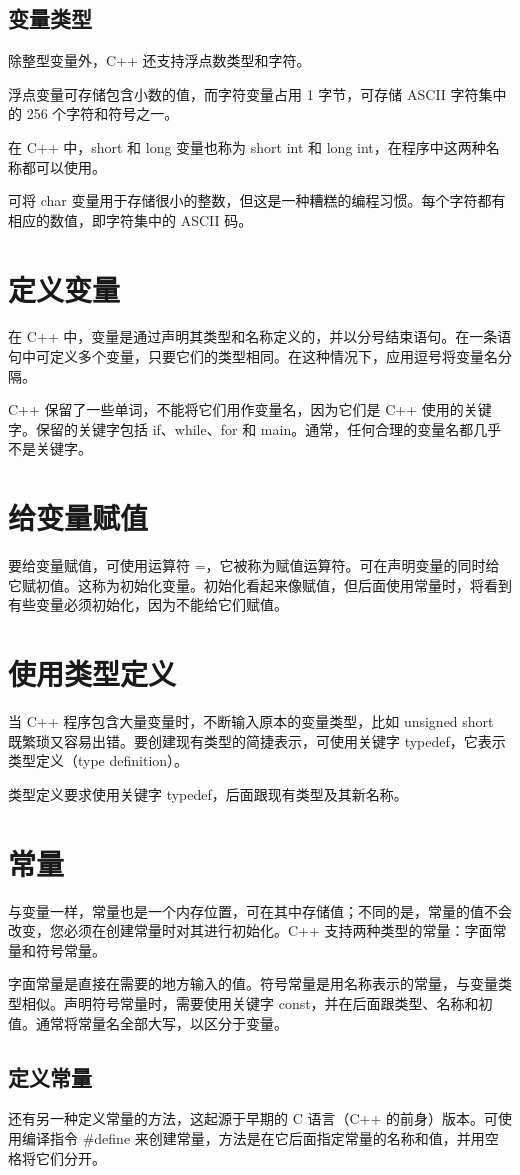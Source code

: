 \subsection*{变量类型}
除整型变量外，C++ 还支持浮点数类型和字符。

浮点变量可存储包含小数的值，而字符变量占用 1 字节，可存储 ASCII 字符集中的 256 个字符和符号之一。

在 C++ 中，short 和 long 变量也称为 short int 和 long int，在程序中这两种名称都可以使用。

可将 char 变量用于存储很小的整数，但这是一种糟糕的编程习惯。每个字符都有相应的数值，即字符集中的 ASCII 码。
\section{定义变量}
在 C++ 中，变量是通过声明其类型和名称定义的，并以分号结束语句。在一条语句中可定义多个变量，只要它们的类型相同。在这种情况下，应用逗号将变量名分隔。

C++ 保留了一些单词，不能将它们用作变量名，因为它们是 C++ 使用的关键字。保留的关键字包括 if、while、for 和 main。通常，任何合理的变量名都几乎不是关键字。
\section{给变量赋值}
要给变量赋值，可使用运算符 =，它被称为赋值运算符。可在声明变量的同时给它赋初值。这称为初始化变量。初始化看起来像赋值，但后面使用常量时，将看到有些变量必须初始化，因为不能给它们赋值。

\section{使用类型定义}
当 C++ 程序包含大量变量时，不断输入原本的变量类型，比如 unsigned short 既繁琐又容易出错。要创建现有类型的简捷表示，可使用关键字 typedef，它表示类型定义（type definition）。

类型定义要求使用关键字 typedef，后面跟现有类型及其新名称。
\section{常量}
与变量一样，常量也是一个内存位置，可在其中存储值；不同的是，常量的值不会改变，您必须在创建常量时对其进行初始化。C++ 支持两种类型的常量：字面常量和符号常量。

字面常量是直接在需要的地方输入的值。符号常量是用名称表示的常量，与变量类型相似。声明符号常量时，需要使用关键字 const，并在后面跟类型、名称和初值。通常将常量名全部大写，以区分于变量。
\subsection*{定义常量}
还有另一种定义常量的方法，这起源于早期的 C 语言（C++ 的前身）版本。可使用编译指令 \#define 来创建常量，方法是在它后面指定常量的名称和值，并用空格将它们分开。

